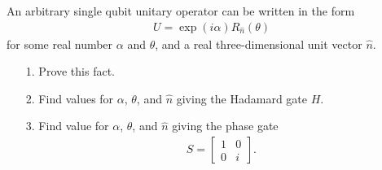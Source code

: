 \documentclass[en]{sol-man}
\begin{document}
\begin{exe}
    An arbitrary single qubit unitary operator can be written in the form
    \begin{align}
        U=\exp(i\alpha)R_{\hat{n}}(\theta)
    \end{align}
    for some real number $\alpha$ and $\theta$, and a real three-dimensional unit vector $\hat{n}$.
    \begin{itemize}
        \item[1.] Prove this fact.
        \item[2.] Find values for $\alpha$, $\theta$, and $\hat{n}$ giving the Hadamard gate $H$.
        \item[3.] Find value for $\alpha$, $\theta$, and $\hat{n}$ giving the phase gate
        \begin{align}
            S=\left[\begin{matrix}
                1&0\\
                0&i
            \end{matrix}\right].
        \end{align}
    \end{itemize}
\end{exe}
\end{document}

